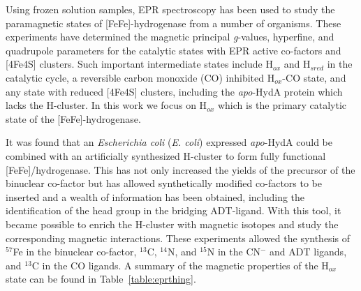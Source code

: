 Using frozen solution samples, EPR spectroscopy has been used to study the paramagnetic states of [FeFe]-hydrogenase from a number of organisms. \cite{lubitzhyd,Silakov57Fe,Adamska2015pdt,Adamska2015} These experiments have determined the magnetic principal \textit{g}-values, hyperfine, and quadrupole parameters for the catalytic states with EPR active co-factors and [4Fe4S] clusters. Such important intermediate states include H$_{ox}$ and H$_{sred}$ in the catalytic cycle, a reversible carbon monoxide (CO) inhibited H$_{ox}$-CO state, and any state with reduced [4Fe4S] clusters, including the \textit{apo}-HydA protein which lacks the H-cluster. In this work we focus on H$_{ox}$ which is the primary catalytic state of the [FeFe]-hydrogenase.

It was found that an {\em Escherichia coli} ({\em E. coli}) expressed \textit{apo}-HydA could be combined with an artificially synthesized H-cluster to form fully functional [FeFe]\-/hydrogenase. \cite{EsselbornArtificial, BirrellArtificial} This has not only increased the yields of the precursor of the binuclear co-factor but has allowed synthetically modified co-factors to be inserted and a wealth of information has been obtained, including the identification of the head group in the bridging ADT-ligand. \cite{AdamskaBridgingAmine} With this tool, it became possible to enrich the H-cluster with magnetic isotopes and study the corresponding magnetic interactions. These experiments allowed the synthesis of $^{57}$Fe in the binuclear  co-factor, $^{13}$C, $^{14}$N, and $^{15}$N in the CN$^-$ and ADT ligands, and $^{13}$C in the CO ligands. A summary of the magnetic properties of the H$_{ox}$ state can be found in Table~\ref{table:eprthing}. 

